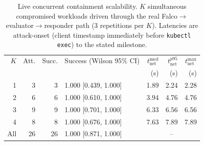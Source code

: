 \begin{table}[t]
\centering
\caption{Live concurrent containment scalability. $K$ simultaneous compromised workloads driven through the real Falco$\rightarrow$evaluator$\rightarrow$responder path (3 repetitions per $K$). Latencies are attack-onset (client timestamp immediately before \texttt{kubectl exec}) to the stated milestone.}
\label{tab:scal-physical}
\begin{tabular}{rrrlrrr}
\toprule
$K$ & Att. & Succ. & Success (Wilson 95\% CI) & $t_{\text{net}}^{\text{med}}$ & $t_{\text{net}}^{p95}$ & $t_{\text{net}}^{\max}$ \\
 & & & & (s) & (s) & (s) \\
\midrule
1 & 3 & 3 & 1.000 [0.439, 1.000] & 1.89 & 2.24 & 2.28 \\
2 & 6 & 6 & 1.000 [0.610, 1.000] & 3.94 & 4.76 & 4.76 \\
3 & 9 & 9 & 1.000 [0.701, 1.000] & 6.33 & 6.56 & 6.56 \\
4 & 8 & 8 & 1.000 [0.676, 1.000] & 7.63 & 7.89 & 7.89 \\
\midrule
All & 26 & 26 & 1.000 [0.871, 1.000] & \multicolumn{3}{c}{--} \\
\bottomrule
\end{tabular}
\end{table}
